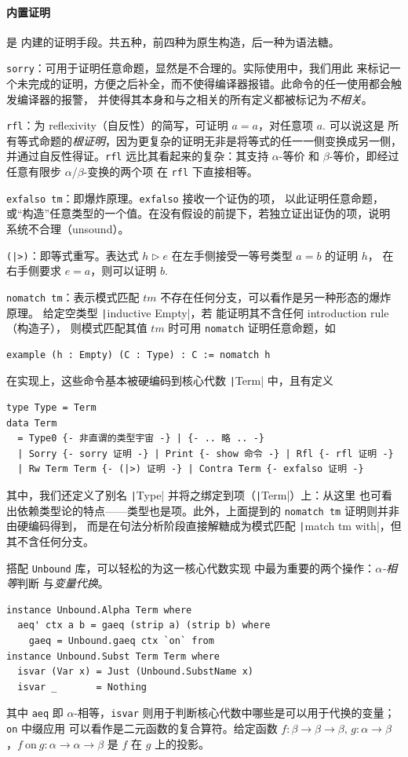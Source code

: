 \paragraph{内置证明} 是 \Tigrisd 内建的证明手段。共五种，前四种为原生构造，后一种为语法糖。

\texttt{sorry}：可用于证明任意命题，显然是不合理的。实际使用中，我们用此
来标记一个未完成的证明，方便之后补全，而不使得编译器报错。此命令的任一使用都会触发编译器的报警，
并使得其本身和与之相关的所有定义都被标记为\emph{不相关}。

\texttt{rfl}：为 reflexivity（自反性）的简写，可证明 $a = a$，对任意项 $a$. 可以说这是
所有等式命题的\emph{根证明}，因为更复杂的证明无非是将等式的任一一侧变换成另一侧，并通过自反性得证。\texttt{rfl}
远比其看起来的复杂：其支持 $\alpha$-等价 和 $\beta$-等价，即经过任意有限步 $\alpha$/$\beta$-变换的两个项
在 \texttt{rfl} 下直接相等。

\texttt{exfalso tm}：即爆炸原理。\texttt{exfalso} 接收一个证伪的项，
以此证明任意命题，或“构造”任意类型的一个值。在没有假设的前提下，若独立证出证伪的项，说明
系统不合理（unsound）。

\texttt{(|>)}：即等式重写。表达式 $h\triangleright e$ 在左手侧接受一等号类型 $a = b$ 的证明 $h$，
在右手侧要求 $e = a$，则可以证明 $b$.

\texttt{nomatch tm}：表示模式匹配 $tm$ 不存在任何分支，可以看作是另一种形态的爆炸原理。
给定空类型 \texttt|inductive Empty|，若 \Tigrisd 能证明其不含任何 introduction rule（构造子），
则模式匹配其值 $tm$ 时可用 \texttt{nomatch} 证明任意命题，如
\begin{verbatim}
example (h : Empty) (C : Type) : C := nomatch h
\end{verbatim}
在实现上，这些命令基本被硬编码到核心代数 \texttt|Term| 中，且有定义
\begin{verbatim}
type Type = Term
data Term
  = Type0 {- 非直谓的类型宇宙 -} | {- .. 略 .. -}
  | Sorry {- sorry 证明 -} | Print {- show 命令 -} | Rfl {- rfl 证明 -}
  | Rw Term Term {- (|>) 证明 -} | Contra Term {- exfalso 证明 -}
\end{verbatim}
其中，我们还定义了别名 \texttt|Type| 并将之绑定到项（\texttt|Term|）上：从这里
也可看出依赖类型论的特点——类型也是项。此外，上面提到的 \texttt{nomatch tm} 证明则并非由硬编码得到，
而是在句法分析阶段直接解糖成为模式匹配 \texttt|match tm with|，但其不含任何分支。

搭配 \texttt{Unbound} 库，可以轻松的为这一核心代数实现 \lambdacalc 中最为重要的两个操作：\emph{$\alpha$-相等}判断
与\emph{变量代换}。
\begin{verbatim}
instance Unbound.Alpha Term where
  aeq' ctx a b = gaeq (strip a) (strip b) where
    gaeq = Unbound.gaeq ctx `on` from
instance Unbound.Subst Term Term where
  isvar (Var x) = Just (Unbound.SubstName x)
  isvar _       = Nothing
\end{verbatim}
其中 \texttt{aeq} 即 $\alpha$-相等，\texttt{isvar} 则用于判断核心代数中哪些是可以用于代换的变量；\texttt{on} 中缀应用
可以看作是二元函数的复合算符。给定函数 $f : \beta\to\beta\to\beta,\, g:\alpha\to\beta$，$f\ \mathrm{on}\ g:\alpha\to\alpha\to\beta$ 是
$f$ 在 $g$ 上的投影。

